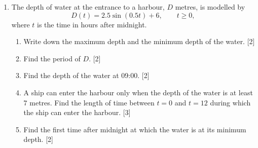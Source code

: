 \documentclass[12pt, twoside]{article}
\begin{document}
\begin{enumerate}[itemsep=0.15cm]

\newpage

\item[4.] [Maximum mark: 11]

The depth of water at the entrance to a harbour, $D$ metres, is modelled by
\[
  D(t) = 2.5\sin(0.5t) + 6, \qquad t \ge 0,
\]
where $t$ is the time in hours after midnight.

\begin{enumerate}[itemsep=0.1cm]
  \item Write down the maximum depth and the minimum depth of the water.
  \hfill [2]
  \item Find the period of $D$. \hfill [2]
  \item Find the depth of the water at 09:00. \hfill [2]
  \item A ship can enter the harbour only when the depth of the water is
  at least $7$ metres. Find the length of time between $t = 0$ and
  $t = 12$ during which the ship can enter the harbour. \hfill [3]
  \item Find the first time after midnight at which the water is at its
  minimum depth. \hfill [2]
\end{enumerate}


\end{enumerate}
\end{document}
